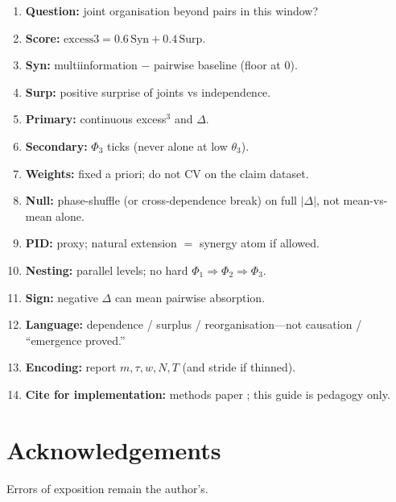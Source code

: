 \documentclass[11pt,a4paper]{article}
\begin{document}
{\small
\begin{tcolorbox}[
  colback=blue!3!white,
  colframe=blue!75!black,
  title={\textbf{excess$^3$ one-page cheat sheet (print this page)}},
  fonttitle=\bfseries,
  boxrule=0.9pt,
  left=3pt,right=3pt,top=2pt,bottom=2pt
]
\begin{enumerate}[leftmargin=*,itemsep=1pt]
  \item \textbf{Question:} joint organisation beyond pairs in this window?
  \item \textbf{Score:}
  $\mathrm{excess3}=0.6\,\mathrm{Syn}+0.4\,\mathrm{Surp}$.
  \item \textbf{Syn:} multiinformation $-$ pairwise baseline (floor at 0).
  \item \textbf{Surp:} positive surprise of joints vs independence.
  \item \textbf{Primary:} continuous excess$^3$ and $\Delta$.
  \item \textbf{Secondary:} $\Phi_3$ ticks (never alone at low $\theta_3$).
  \item \textbf{Weights:} fixed a priori; do not CV on the claim dataset.
  \item \textbf{Null:} phase-shuffle (or cross-dependence break) on full
  $|\Delta|$, not mean-vs-mean alone.
  \item \textbf{PID:} proxy; natural extension $=$ synergy atom if allowed.
  \item \textbf{Nesting:} parallel levels; no hard
  $\Phi_1\Rightarrow\Phi_2\Rightarrow\Phi_3$.
  \item \textbf{Sign:} negative $\Delta$ can mean pairwise absorption.
  \item \textbf{Language:} dependence / surplus / reorganisation---not
  causation / ``emergence proved.''
  \item \textbf{Encoding:} report $m,\tau,w,N,T$ (and stride if thinned).
  \item \textbf{Cite for implementation:} methods paper
  \citep{Padilla2026excess3}; this guide is pedagogy only.
\end{enumerate}
\end{tcolorbox}
}

\section*{Acknowledgements}
Errors of exposition remain the author's.
\end{document}

